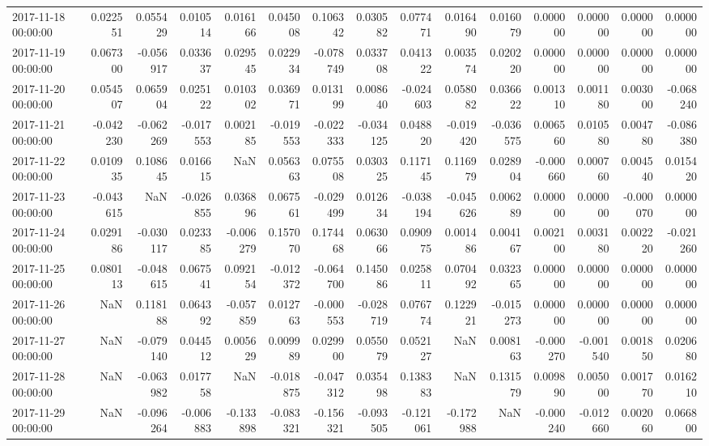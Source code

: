 \begin{tabular}{lrrrrrrrrrrrrrr}
2017-11-18 00:00:00 & 0.022551 & 0.055429 & 0.010514 & 0.016166 & 0.045008 & 0.106342 & 0.030582 & 0.077471 & 0.016490 & 0.016079 & 0.000000 & 0.000000 & 0.000000 & 0.000000 \\
2017-11-19 00:00:00 & 0.067300 & -0.056917 & 0.033637 & 0.029545 & 0.022934 & -0.078749 & 0.033708 & 0.041322 & 0.003574 & 0.020220 & 0.000000 & 0.000000 & 0.000000 & 0.000000 \\
2017-11-20 00:00:00 & 0.054507 & 0.065904 & 0.025122 & 0.010302 & 0.036971 & 0.013199 & 0.008640 & -0.024603 & 0.058082 & 0.036622 & 0.001310 & 0.001180 & 0.003000 & -0.068240 \\
2017-11-21 00:00:00 & -0.042230 & -0.062269 & -0.017553 & 0.002185 & -0.019553 & -0.022333 & -0.034125 & 0.048820 & -0.019420 & -0.036575 & 0.006560 & 0.010580 & 0.004780 & -0.086380 \\
2017-11-22 00:00:00 & 0.010935 & 0.108645 & 0.016615 & NaN & 0.056363 & 0.075508 & 0.030325 & 0.117145 & 0.116979 & 0.028904 & -0.000660 & 0.000760 & 0.004540 & 0.015420 \\
2017-11-23 00:00:00 & -0.043615 & NaN & -0.026855 & 0.036896 & 0.067561 & -0.029499 & 0.012634 & -0.038194 & -0.045626 & 0.006289 & 0.000000 & 0.000000 & -0.000070 & 0.000000 \\
2017-11-24 00:00:00 & 0.029186 & -0.030117 & 0.023385 & -0.006279 & 0.157070 & 0.174468 & 0.063066 & 0.090975 & 0.001486 & 0.004167 & 0.002100 & 0.003180 & 0.002220 & -0.021260 \\
2017-11-25 00:00:00 & 0.080113 & -0.048615 & 0.067541 & 0.092154 & -0.012372 & -0.064700 & 0.145086 & 0.025811 & 0.070492 & 0.032365 & 0.000000 & 0.000000 & 0.000000 & 0.000000 \\
2017-11-26 00:00:00 & NaN & 0.118188 & 0.064392 & -0.057859 & 0.012763 & -0.000553 & -0.028719 & 0.076774 & 0.122921 & -0.015273 & 0.000000 & 0.000000 & 0.000000 & 0.000000 \\
2017-11-27 00:00:00 & NaN & -0.079140 & 0.044512 & 0.005629 & 0.009989 & 0.029900 & 0.055079 & 0.052127 & NaN & 0.008163 & -0.000270 & -0.001540 & 0.001850 & 0.020680 \\
2017-11-28 00:00:00 & NaN & -0.063982 & 0.017758 & NaN & -0.018875 & -0.047312 & 0.035498 & 0.138383 & NaN & 0.131579 & 0.009890 & 0.005000 & 0.001770 & 0.016210 \\
2017-11-29 00:00:00 & NaN & -0.096264 & -0.006883 & -0.133898 & -0.083321 & -0.156321 & -0.093505 & -0.121061 & -0.172988 & NaN & -0.000240 & -0.012660 & 0.002060 & 0.066800 \\

\end{tabular}

